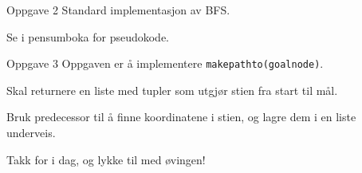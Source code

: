 \documentclass[14pt]{beamer}
\begin{document}
\begin{frame}{Oppgave 2}
    Standard implementasjon av BFS.

    \pause

    Se i pensumboka for pseudokode.
\end{frame}
\begin{frame}[fragile]{Oppgave 3}
    Oppgaven er å implementere \verb|makepathto(goalnode)|.

    \pause

    Skal returnere en liste med tupler som utgjør stien fra start til mål.

    \pause

    Bruk predecessor til å finne koordinatene i stien, og lagre dem i en liste underveis.
\end{frame}
\begin{frame}[standout]
    Takk for i dag, og lykke til med øvingen!
\end{frame}
\end{document}
